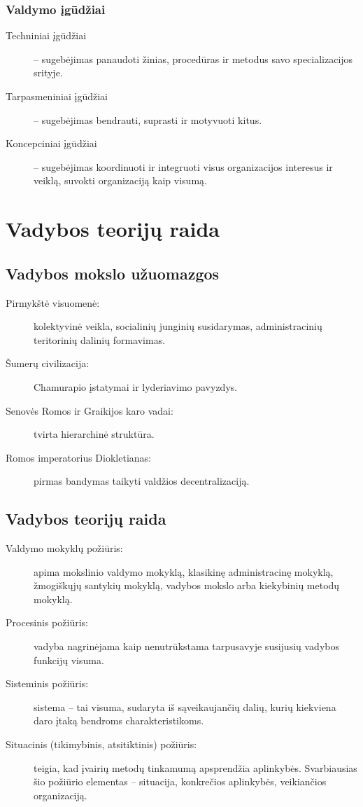 \subsection{Valdymo įgūdžiai}

\begin{description}
  \item[Techniniai įgūdžiai] – sugebėjimas panaudoti žinias, procedūras
    ir metodus savo specializacijos srityje.
  \item[Tarpasmeniniai įgūdžiai] – sugebėjimas bendrauti, suprasti
    ir motyvuoti kitus.
  \item[Koncepciniai įgūdžiai] – sugebėjimas koordinuoti ir integruoti
    visus organizacijos interesus ir veiklą, suvokti organizaciją
    kaip visumą.
\end{description}

\chapter{Vadybos teorijų raida}

\section{Vadybos mokslo užuomazgos}

\begin{description}
  \item[Pirmykštė visuomenė:] kolektyvinė veikla, socialinių junginių
    susidarymas, administracinių teritorinių dalinių formavimas.
  \item[Šumerų civilizacija:] Chamurapio įstatymai ir lyderiavimo
    pavyzdys.
  \item[Senovės Romos ir Graikijos karo vadai:] tvirta hierarchinė
    struktūra.
  \item[Romos imperatorius Diokletianas:] pirmas bandymas taikyti
    valdžios decentralizaciją.
\end{description}

\section{Vadybos teorijų raida}

\begin{description}
  \item[Valdymo mokyklų požiūris:] apima mokslinio valdymo mokyklą, 
    klasikinę administracinę mokyklą, žmogiškųjų santykių mokyklą,
    vadybos mokslo arba kiekybinių metodų mokyklą.
  \item[Procesinis požiūris:] vadyba nagrinėjama kaip nenutrūkstama
    tarpusavyje susijusių vadybos funkcijų visuma.
  \item[Sisteminis požiūris:] sistema – tai visuma, sudaryta iš
    sąveikaujančių dalių, kurių kiekviena daro įtaką bendroms
    charakteristikoms.
  \item[Situacinis (tikimybinis, atsitiktinis) požiūris:] teigia,
    kad įvairių metodų tinkamumą apsprendžia aplinkybės. Svarbiausias
    šio požiūrio elementas – situacija, konkrečios aplinkybės,
    veikiančios organizaciją.
\end{description}

